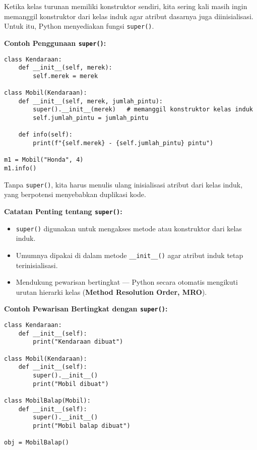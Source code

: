 Ketika kelas turunan memiliki konstruktor sendiri, kita sering kali masih ingin memanggil konstruktor dari kelas induk agar atribut dasarnya juga diinisialisasi.  
Untuk itu, Python menyediakan fungsi \texttt{super()}.

\noindent\textbf{Contoh Penggunaan \texttt{super()}:}

\begin{lstlisting}[style=PythonStyle, caption={Menggunakan super() untuk Memanggil Konstruktor Induk}]
class Kendaraan:
    def __init__(self, merek):
        self.merek = merek

class Mobil(Kendaraan):
    def __init__(self, merek, jumlah_pintu):
        super().__init__(merek)   # memanggil konstruktor kelas induk
        self.jumlah_pintu = jumlah_pintu

    def info(self):
        print(f"{self.merek} - {self.jumlah_pintu} pintu")

m1 = Mobil("Honda", 4)
m1.info()
\end{lstlisting}

Tanpa \texttt{super()}, kita harus menulis ulang inisialisasi atribut dari kelas induk, yang berpotensi menyebabkan duplikasi kode.

\textbf{Catatan Penting tentang \texttt{super()}:}
\begin{itemize}
    \item \texttt{super()} digunakan untuk mengakses metode atau konstruktor dari kelas induk.
    \item Umumnya dipakai di dalam metode \texttt{__init__()} agar atribut induk tetap terinisialisasi.
    \item Mendukung pewarisan bertingkat — Python secara otomatis mengikuti urutan hierarki kelas (\textbf{Method Resolution Order, MRO}).
\end{itemize}

\noindent\textbf{Contoh Pewarisan Bertingkat dengan \texttt{super()}:}

\begin{lstlisting}[style=PythonStyle, caption={super() dalam Pewarisan Bertingkat}]
class Kendaraan:
    def __init__(self):
        print("Kendaraan dibuat")

class Mobil(Kendaraan):
    def __init__(self):
        super().__init__()
        print("Mobil dibuat")

class MobilBalap(Mobil):
    def __init__(self):
        super().__init__()
        print("Mobil balap dibuat")

obj = MobilBalap()
\end{lstlisting}


